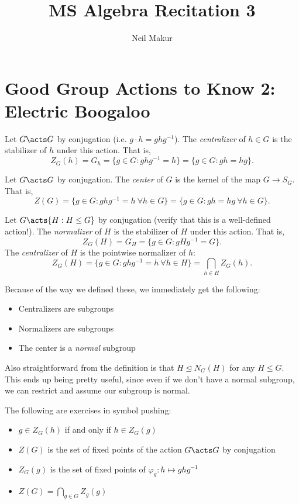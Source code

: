 \documentclass{article}
\title{MS Algebra Recitation 3}
\author{Neil Makur}
\date{}
\begin{document}
\maketitle

\section{Good Group Actions to Know 2: Electric Boogaloo}

\begin{defn*} Let $G\acts G$ by conjugation (i.e. $g\cdot h=ghg^{-1}$). The \textit{centralizer} of $h\in G$ is the stabilizer of $h$ under this action. That is,
$$Z_G(h)=G_h=\{g\in G:ghg^{-1}=h\}=\{g\in G:gh=hg\}.$$
\end{defn*}

\begin{defn*} Let $G\acts G$ by conjugation. The \textit{center} of $G$ is the kernel of the map $G\to S_G$. That is,
$$Z(G)=\{g\in G:ghg^{-1}=h~\forall h\in G\}=\{g\in G:gh=hg~\forall h\in G\}.$$
\end{defn*}

\begin{defn*} Let $G\acts\{H:H\leq G\}$ by conjugation (verify that this is a well-defined action!). The \textit{normalizer} of $H$ is the stabilizer of $H$ under this action. That is,
$$Z_G(H)=G_H=\{g\in G:gHg^{-1}=G\}.$$
The \textit{centralizer} of $H$ is the pointwise normalizer of $h$:
$$Z_G(H)=\{g\in G:ghg^{-1}=h~\forall h\in H\}=\bigcap_{h\in H}Z_G(h).$$
\end{defn*}

\noindent Because of the way we defined these, we immediately get the following:
\begin{itemize}
  \item Centralizers are subgroups
  \item Normalizers are subgroups
  \item The center is a \textit{normal} subgroup
\end{itemize}

Also straightforward from the definition is that $H\unlhd N_G(H)$ for any $H\leq G$. This ends up being pretty useful, since even if we don't have a normal subgroup, we can restrict and assume our subgroup is normal.

The following are exercises in symbol pushing:
\begin{itemize}
  \item $g\in Z_G(h)$ if and only if $h\in Z_G(g)$
  \item $Z(G)$ is the set of fixed points of the action $G\acts G$ by conjugation
  \item $Z_G(g)$ is the set of fixed points of $\varphi_g:h\mapsto ghg^{-1}$
  \item $Z(G)=\bigcap_{g\in G}Z_g(g)$
\end{itemize}
\end{document}
